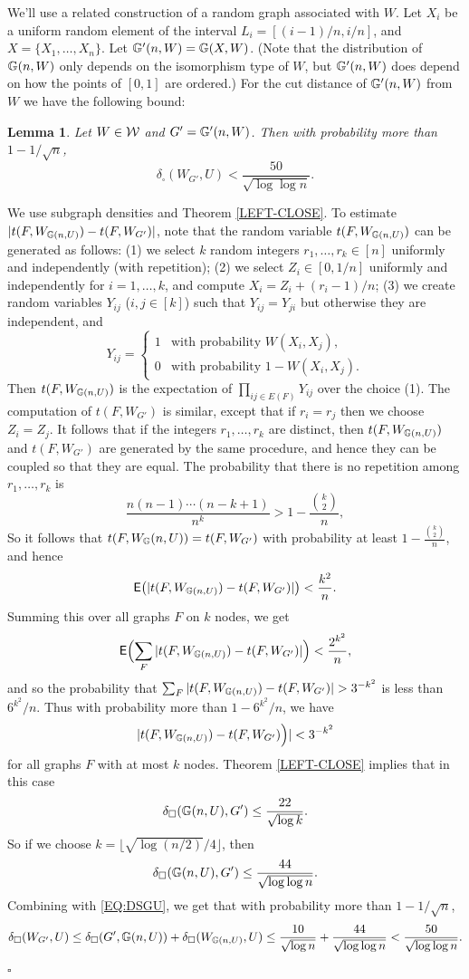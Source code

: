 \documentclass{article}
\newtheorem{lemma}[theorem]{Lemma}
\newenvironment{proof}{\medskip\noindent{\bf Proof. }}{\hfill$\square$\medskip}
\begin{document}
We'll use a related construction of a random graph associated with
$W$. Let $X_i$ be a uniform random element of the interval
$L_i=[(i-1)/n,i/n]$, and $X=\{X_1,\dots,X_n\}$. Let
${\mathbb G}'(n,W)={\mathbb G}(X,W)$. (Note that the distribution of ${\mathbb G}(n,W)$ only
depends on the isomorphism type of $W$, but ${\mathbb G}'(n,W)$ does depend
on how the points of $[0,1]$ are ordered.) For the cut distance of
${\mathbb G}'(n,W)$ from $W$ we have the following bound:

\begin{lemma}\label{LEM:GPRIME}
Let $W\in\mathcal{W}$ and $G'={\mathbb G}'(n,W)$. Then with probability more than
$1-1/\sqrt{n}$,
\[
\delta_\square(W_{G'},U) < \frac{50}{\sqrt{\log\log n}}.
\]
\end{lemma}

\begin{proof}
We use subgraph densities and Theorem \ref{LEFT-CLOSE}. To estimate
$|t(F,W_{{\mathbb G}(n,U)})-t(F,W_{G'})|$, note that the random variable
$t(F,W_{{\mathbb G}(n,U)})$ can be generated as follows: (1) we select $k$
random integers $r_1,\dots,r_k\in[n]$ uniformly and independently
(with repetition); (2) we select $Z_i\in [0,1/n]$ uniformly and
independently for $i=1,\dots,k$, and compute $X_i=Z_i+(r_i-1)/n$; (3)
we create random variables $Y_{ij}$ ($i,j\in[k]$) such that
$Y_{ij}=Y_{ji}$ but otherwise they are independent, and
\[
Y_{ij}=
  \begin{cases}
    1 & \text{with probability $W(X_i,X_j)$}, \\
    0 & \text{with probability $1-W(X_i,X_j)$}.
  \end{cases}
\]
Then $t(F,W_{{\mathbb G}(n,U)})$ is the expectation of $\prod_{ij\in
E(F)}Y_{ij}$ over the choice (1). The computation of $t(F,W_{G'})$ is
similar, except that if $r_i=r_j$ then we choose $Z_i=Z_j$. It
follows that if the integers $r_1,\dots,r_k$ are distinct, then
$t(F,W_{{\mathbb G}(n,U)})$ and $t(F,W_{G'})$ are generated by the same
procedure, and hence they can be coupled so that they are equal. The
probability that there is no repetition among $r_1,\dots,r_k$ is
\[
\frac{n(n-1)\cdots(n-k+1)}{n^k} > 1- \frac{\binom{k}{2}}{n},
\]
So it follows that $t(F,W_{\mathbb G}(n,U))=t(F,W_{G'})$ with probability at
least $1- \frac{\binom{k}{2}}{n}$, and hence
\[
{\sf E}\bigl(|t(F,W_{{\mathbb G}(n,U)})-t(F,W_{G'})|\bigr)<\frac{k^2}{n}.
\]
Summing this over all graphs $F$ on $k$ nodes, we get
\[
{\sf E}\Bigl(\sum_F |t(F,W_{{\mathbb G}(n,U)})-t(F,W_{G'})|\Bigr) <
\frac{2^{k^2}}{n},
\]
and so the probability that $\sum_F |t(F,W_{{\mathbb G}(n,U)})-t(F,W_{G'})| >
3^{-k^2}$ is less than $6^{k^2}/n$. Thus with probability more than
$1-6^{k^2}/n$, we have
\[
|t(F,W_{{\mathbb G}(n,U)})-t(F,W_{G'})\Bigr)| <3^{-k^2}
\]
for all graphs $F$ with at most $k$ nodes. Theorem \ref{LEFT-CLOSE}
implies that in this case
\[
\delta_\square({\mathbb G}(n,U),G') \le \frac{22}{\sqrt{\log k}}.
\]
So if we choose $k=\lfloor\sqrt{\log (n/2)}/4\rfloor$, then
\[
\delta_\square({\mathbb G}(n,U), G') \le \frac{44}{\sqrt{\log\log n}}.
\]
Combining with \eqref{EQ:DSGU}, we get that with probability more
than $1-1/\sqrt{n}$,
\[
\delta_\square(W_{G'},U)\le \delta_\square(G', {\mathbb G}(n,U))
+ \delta_\square(W_{{\mathbb G}(n,U)},U)\le \frac{10}{\sqrt{\log n}} +
\frac{44}{\sqrt{\log\log n}} < \frac{50}{\sqrt{\log\log n}}.
\]
\end{proof}
\end{document}

